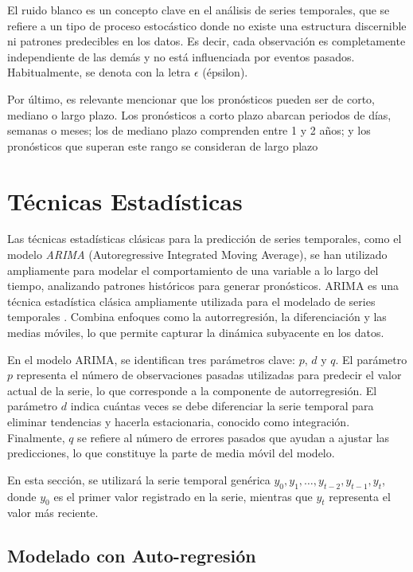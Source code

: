 El ruido blanco es un concepto clave en el análisis de series temporales, que se refiere a un tipo de proceso estocástico donde no existe una estructura discernible ni patrones predecibles en los datos. Es decir, cada observación es completamente independiente de las demás y no está influenciada por eventos pasados. Habitualmente, se denota con la letra $\epsilon$ (épsilon).

Por último, es relevante mencionar que los pronósticos pueden ser de corto, mediano o largo plazo. Los pronósticos a corto plazo abarcan periodos de días, semanas o meses; los de mediano plazo comprenden entre 1 y 2 años; y los pronósticos que superan este rango se consideran de largo plazo \cite{kulahci2015introduction}


\section{Técnicas Estadísticas}

Las técnicas estadísticas clásicas para la predicción de series temporales, como el modelo \textit{ARIMA} (Autoregressive Integrated Moving Average), se han utilizado ampliamente para modelar el comportamiento de una variable a lo largo del tiempo, analizando patrones históricos para generar pronósticos. ARIMA es una técnica estadística clásica ampliamente utilizada para el modelado de series temporales \cite{hyndman}. Combina enfoques como la autorregresión, la diferenciación y las medias móviles, lo que permite capturar la dinámica subyacente en los datos.

En el modelo ARIMA, se identifican tres parámetros clave: \(p\), \(d\) y \(q\). El parámetro \(p\) representa el número de observaciones pasadas utilizadas para predecir el valor actual de la serie, lo que corresponde a la componente de autorregresión. El parámetro \(d\) indica cuántas veces se debe diferenciar la serie temporal para eliminar tendencias y hacerla estacionaria, conocido como integración. Finalmente, \(q\) se refiere al número de errores pasados que ayudan a ajustar las predicciones, lo que constituye la parte de media móvil del modelo.

En esta sección, se utilizará la serie temporal genérica \(y_0, y_1, \dots, y_{t-2}, y_{t-1}, y_t\), donde \(y_0\) es el primer valor registrado en la serie, mientras que \(y_t\) representa el valor más reciente.

\subsection{Modelado con Auto-regresión}

